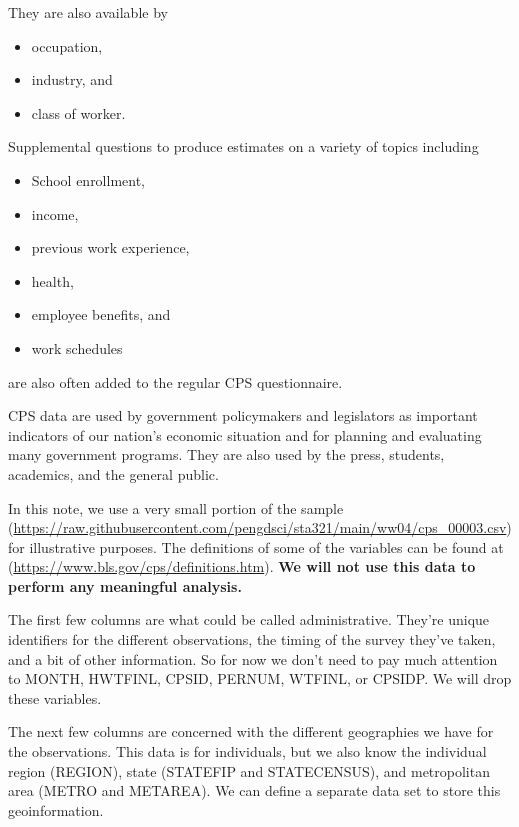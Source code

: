 \documentclass[
]{book}
\providecommand{\tightlist}{%
  \setlength{\itemsep}{0pt}\setlength{\parskip}{0pt}}
\begin{document}
They are also available by

\begin{itemize}
\tightlist
\item
  occupation,
\item
  industry, and
\item
  class of worker.
\end{itemize}

Supplemental questions to produce estimates on a variety of topics including

\begin{itemize}
\tightlist
\item
  School enrollment,
\item
  income,\\
\item
  previous work experience,
\item
  health,
\item
  employee benefits, and
\item
  work schedules
\end{itemize}

are also often added to the regular CPS questionnaire.

CPS data are used by government policymakers and legislators as important indicators of our nation's economic situation and for planning and evaluating many government programs. They are also used by the press, students, academics, and the general public.

In this note, we use a very small portion of the sample (\url{https://raw.githubusercontent.com/pengdsci/sta321/main/ww04/cps_00003.csv}) for illustrative purposes. The definitions of some of the variables can be found at (\url{https://www.bls.gov/cps/definitions.htm}). \textbf{We will not use this data to perform any meaningful analysis.}

The first few columns are what could be called administrative. They're unique identifiers for the different observations, the timing of the survey they've taken, and a bit of other information. So for now we don't need to pay much attention to MONTH, HWTFINL, CPSID, PERNUM, WTFINL, or CPSIDP. We will drop these variables.

The next few columns are concerned with the different geographies we have for the observations. This data is for individuals, but we also know the individual region (REGION), state (STATEFIP and STATECENSUS), and metropolitan area (METRO and METAREA). We can define a separate data set to store this geoinformation.
\end{document}
